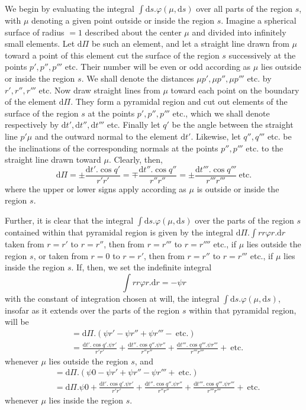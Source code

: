 We begin by evaluating the integral $\int\mathrm{d}s.\varphi(\mu,\mathrm{d}s)$ over all parts of the region $s$, with $\mu$ denoting a given point outside or inside the region $s$. Imagine a spherical surface of radius $=1$ described about the center $\mu$ and divided into infinitely small elements. Let $\mathrm{d}\Pi$ be such an element, and let a straight line drawn from $\mu$ toward a point of this element cut the surface of the region $s$ successively at the points $p',p'',p'''$ etc. Their number will be even or odd according as $\mu$ lies outside or inside the region $s$. We shall denote the distances $\mu p',\mu p'',\mu p'''$ etc. by $r',r'',r'''$ etc. Now draw straight lines from $\mu$ toward each point on the boundary of the element $\mathrm{d}\Pi$. They form a pyramidal region and cut out elements of the surface of the region $s$ at the points $p',p'',p'''$ etc., which we shall denote respectively by $\mathrm{d}t',\mathrm{d}t'',\mathrm{d}t'''$ etc. Finally let $q'$ be the angle between the straight line $p'\mu$ and the outward normal to the element $\mathrm{d}t'$. Likewise, let $q'',q'''$ etc. be the inclinations of the corresponding normals at the points $p'',p'''$ etc. to the straight line drawn toward $\mu$. Clearly, then,
\[
\mathrm{d}\Pi=\pm\frac{\mathrm{d}t'.\cos q'}{r'r'}=\mp\frac{\mathrm{d}t''.\cos q''}{r''r''}=\pm\frac{\mathrm{d}t'''.\cos q'''}{r'''r'''}\ \text{etc.}
\]
where the upper or lower signs apply according as $\mu$ is outside or inside the region $s$.

Further, it is clear that the integral $\int\mathrm{d}s.\varphi(\mu,\mathrm{d}s)$ over the parts of the region $s$ contained within that pyramidal region is given by the integral $\mathrm{d}\Pi.\int rr\varphi r.\mathrm{d}r$ taken from $r=r'$ to $r=r''$, then from $r=r'''$ to $r=r''''$ etc., if $\mu$ lies outside the region $s$, or taken from $r=0$ to $r=r'$, then from $r=r''$ to $r=r'''$ etc., if $\mu$ lies inside the region $s$. If, then, we set the indefinite integral
\[
\int rr\varphi r.\mathrm{d}r=-\psi r
\]
with the constant of integration chosen at will, the integral $\int\mathrm{d}s.\varphi(\mu,\mathrm{d}s)$, insofar as it extends over the parts of the region $s$ within that pyramidal region, will be
\[
\begin{aligned}
&=\mathrm{d}\Pi.(\psi r'-\psi r''+\psi r'''-\ \text{etc.})\\
&=\frac{\mathrm{d}t'.\cos q'.\psi r'}{r'r'}+\frac{\mathrm{d}t''.\cos q''.\psi r''}{r''r''}+\frac{\mathrm{d}t'''.\cos q'''.\psi r'''}{r'''r'''}+\ \text{etc.}
\end{aligned}
\]
whenever $\mu$ lies outside the region $s$, and
\[
\begin{aligned}
&=\mathrm{d}\Pi.(\psi0-\psi r'+\psi r''-\psi r'''+\ \text{etc.})\\
&=\mathrm{d}\Pi.\psi0+\frac{\mathrm{d}t'.\cos q'.\psi r'}{r'r'}+\frac{\mathrm{d}t''.\cos q''.\psi r''}{r''r''}+\frac{\mathrm{d}t'''.\cos q'''.\psi r'''}{r'''r'''}+\ \text{etc.}
\end{aligned}
\]
whenever $\mu$ lies inside the region $s$.

